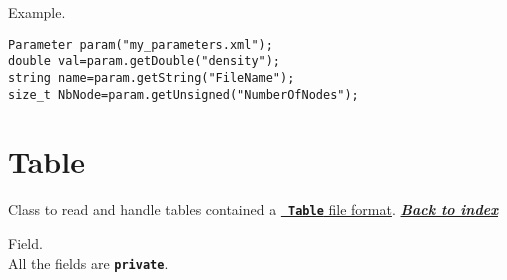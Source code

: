 \documentclass[12pt]{book}
\newcommand{\Index}[0]{{\bf \sl{\color{DodgerBlue} Back to index}}}
\newcommand{\Class}[1]{{\bf \tt{\color{magenta} #1}}}
\begin{document}
{\headline Example.}
\begin{lstlisting}[frame=TB,framerule=0.3pt,caption=read and use a \Class{Parameter} file]
Parameter param("my_parameters.xml");
double val=param.getDouble("density");
string name=param.getString("FileName");
size_t NbNode=param.getUnsigned("NumberOfNodes");
\end{lstlisting}
\newpage
%
%
\section{Table}\label{Table}
\begin{Description*}
Class to read and handle tables contained a \hyperref[TableFormat]{\Class{Table} file format}.
\hfill \hyperref[MainIndex]{\Index}
\end{Description*}

{\headline Field.}\\[5pt]
All the fields are {\bf \tt private}.
\end{document}
